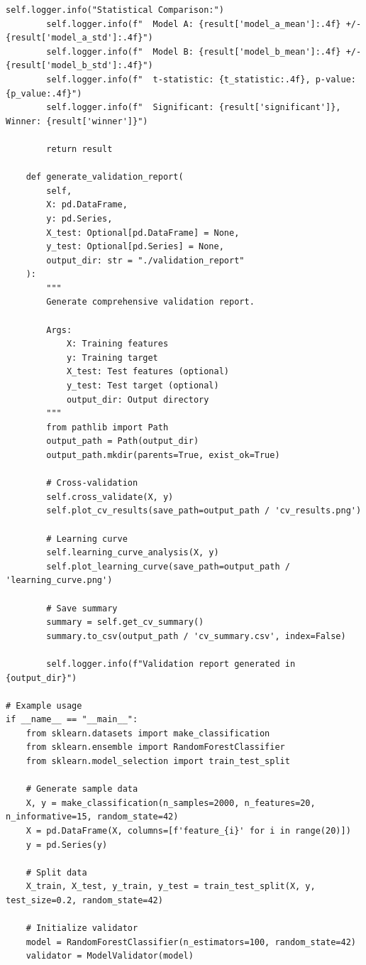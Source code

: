 \begin{lstlisting}[style=python, caption={Production Model Validation Framework}]
        self.logger.info("Statistical Comparison:")
        self.logger.info(f"  Model A: {result['model_a_mean']:.4f} +/- {result['model_a_std']:.4f}")
        self.logger.info(f"  Model B: {result['model_b_mean']:.4f} +/- {result['model_b_std']:.4f}")
        self.logger.info(f"  t-statistic: {t_statistic:.4f}, p-value: {p_value:.4f}")
        self.logger.info(f"  Significant: {result['significant']}, Winner: {result['winner']}")

        return result

    def generate_validation_report(
        self,
        X: pd.DataFrame,
        y: pd.Series,
        X_test: Optional[pd.DataFrame] = None,
        y_test: Optional[pd.Series] = None,
        output_dir: str = "./validation_report"
    ):
        """
        Generate comprehensive validation report.

        Args:
            X: Training features
            y: Training target
            X_test: Test features (optional)
            y_test: Test target (optional)
            output_dir: Output directory
        """
        from pathlib import Path
        output_path = Path(output_dir)
        output_path.mkdir(parents=True, exist_ok=True)

        # Cross-validation
        self.cross_validate(X, y)
        self.plot_cv_results(save_path=output_path / 'cv_results.png')

        # Learning curve
        self.learning_curve_analysis(X, y)
        self.plot_learning_curve(save_path=output_path / 'learning_curve.png')

        # Save summary
        summary = self.get_cv_summary()
        summary.to_csv(output_path / 'cv_summary.csv', index=False)

        self.logger.info(f"Validation report generated in {output_dir}")

# Example usage
if __name__ == "__main__":
    from sklearn.datasets import make_classification
    from sklearn.ensemble import RandomForestClassifier
    from sklearn.model_selection import train_test_split

    # Generate sample data
    X, y = make_classification(n_samples=2000, n_features=20, n_informative=15, random_state=42)
    X = pd.DataFrame(X, columns=[f'feature_{i}' for i in range(20)])
    y = pd.Series(y)

    # Split data
    X_train, X_test, y_train, y_test = train_test_split(X, y, test_size=0.2, random_state=42)

    # Initialize validator
    model = RandomForestClassifier(n_estimators=100, random_state=42)
    validator = ModelValidator(model)


\end{lstlisting}
